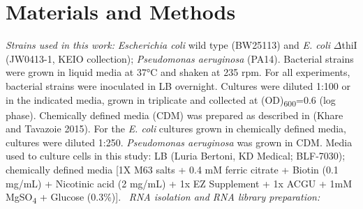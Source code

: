 \documentclass[times, twoside]{zHenriquesLab-StyleBioRxiv}
\begin{document}
\section*{Materials and Methods}
\textit{Strains used in this work: } \newline
\textit{Escherichia coli} wild type (BW25113) and \textit{E. coli} \(\Delta\)thiI (JW0413-1, KEIO collection); \textit{Pseudomonas aeruginosa} (PA14). Bacterial strains were grown in liquid media at 37°C and shaken at 235 rpm. For all experiments, bacterial strains were inoculated in LB overnight. Cultures were diluted 1:100 or in the indicated media, grown in triplicate and collected at (OD)\textsubscript{600}=0.6 (log phase). Chemically defined media (CDM) was prepared as described in (Khare and Tavazoie 2015). For the \textit{E. coli} cultures grown in chemically defined media, cultures were diluted 1:250. \textit{Pseudomonas aeruginosa} was grown in CDM. Media used to culture cells in this study: LB (Luria Bertoni, KD Medical; BLF-7030); chemically defined media [1X M63 salts + 0.4 mM ferric citrate + Biotin (0.1 mg/mL) + Nicotinic acid (2 mg/mL) + 1x EZ Supplement + 1x ACGU + 1mM MgSO\textsubscript{4} + Glucose (0.3\%)]. 
\newline
\newline
\textit{RNA isolation and RNA library preparation: } \newline
\end{document}
